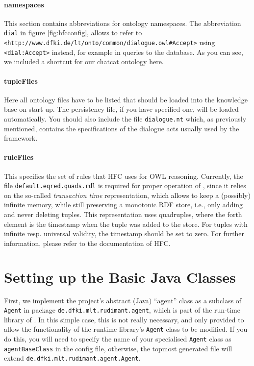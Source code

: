 \paragraph{namespaces}

This section contains abbreviations for ontology namespaces. The abbreviation
\texttt{dial} in figure \ref{fig:hfcconfig}, allows to refer to
\texttt{<http://www.dfki.de/lt/onto/common/dialogue.owl\#Accept>} using
\texttt{<dial:Accept>} instead, for example in queries to the database. As
you can see, we included a shortcut for our chatcat ontology here.

\paragraph{tupleFiles}

Here all ontology files have to be listed that should be loaded into the
knowledge base on start-up. The persistency file, if you have specified one,
will be loaded automatically. You should also include the file
\texttt{dialogue.nt} which, as previously mentioned, contains the
specifications of the dialogue acts usually used by the \vonda framework.

\paragraph{ruleFiles}

This specifies the set of rules that HFC uses for OWL reasoning. Currently, the
file \texttt{default.eqred.quads.rdl} is required for proper operation of
\vonda, since it relies on the so-called \emph{transaction time}
representation, which allows to keep a (possibly) infinite memory, while still
preserving a monotonic RDF store, i.e., only adding and never deleting
tuples. This representation uses quadruples, where the forth element is the
timestamp when the tuple was added to the store. For tuples with infinite
resp. universal validity, the timestamp should be set to zero. For further
information, please refer to the documentation of HFC.

\section{Setting up the Basic Java Classes}

First, we implement the project's abstract (Java) ``agent'' class as a
subclass of \texttt{Agent} in package
\texttt{de.dfki.mlt.rudimant.agent}, which is part of the run-time library
of \vonda. In this simple case, this is not really necessary, and only
provided to allow the functionality of the runtime library's \texttt{Agent}
class to be modified. If you do this, you will need to specify the
name of your specialised \texttt{Agent} class as
\texttt{agentBaseClass} in the config file, otherwise, the topmost
generated file will extend \texttt{de.dfki.mlt.rudimant.agent.Agent}.

